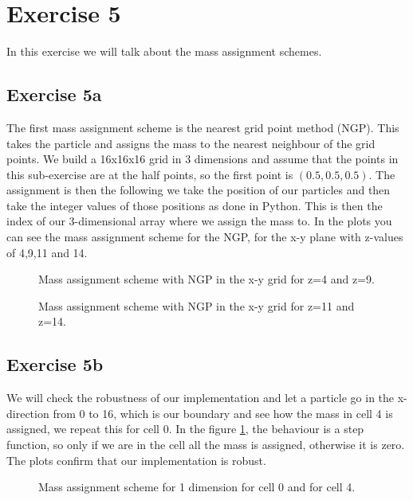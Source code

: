 \section{Exercise 5}
In this exercise we will talk about the mass assignment schemes.
\subsection{Exercise 5a}
The first mass assignment scheme is the nearest grid point method (NGP). This takes the particle and assigns the mass to the nearest neighbour of the grid points. We build a 16x16x16 grid in 3 dimensions and assume that the points in this sub-exercise are at the half points, so the first point is $(0.5,0.5,0.5)$. The assignment is then the following we take the position of our particles and then take the integer values of those positions as done in Python. This is then the index of our 3-dimensional array where we assign the mass to. 
In the plots you can see the mass assignment scheme for the NGP, for the x-y plane with z-values of 4,9,11 and 14.
 \begin{figure}
    \centering
    \qquad
    \caption{Mass assignment scheme with NGP in the x-y grid for z=4 and z=9.}

  \end{figure}
 \begin{figure}
    \centering
    \qquad
    \caption{Mass assignment scheme with NGP in the x-y grid for z=11 and z=14.}
  \end{figure}

\subsection{Exercise 5b}
We will check the robustness of our implementation and let a particle go in the x-direction from 0 to 16, which is our boundary and see how the mass in cell 4 is assigned, we repeat this for cell 0. In the figure \ref{robust}, the behaviour is a step function, so only if we are in the cell all the mass is assigned, otherwise it is zero. The plots confirm that our implementation is robust.

 \begin{figure}
    \centering
    \qquad
    \caption{Mass assignment scheme for 1 dimension for cell 0 and for cell 4.}
    \label{robust}
  \end{figure}


